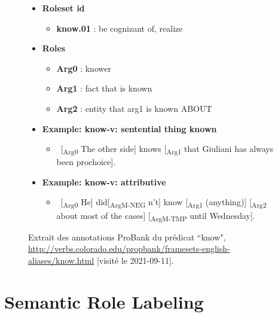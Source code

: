 \documentclass{KBook}
\begin{document}
\begin{figure}[ht]
	\centering
\begin{tcolorbox}[colback=white, colframe=blue, boxrule=1pt, text width=.85\textwidth]
	\footnotesize
	\begin{itemize}
		\item \textbf{Roleset id}
		\begin{itemize}\scriptsize
			\item \textbf{know.01} : be cognizant of, realize
		\end{itemize}
		\item \textbf{Roles}
		\begin{itemize}\scriptsize
			\item \textbf{Arg0} : knower
			\item \textbf{Arg1} : fact that is known
			\item \textbf{Arg2} : entity that arg1 is known ABOUT
		\end{itemize}
		
		\item \textbf{Example: know-v: sentential thing known}
		\begin{itemize}\scriptsize
			\item \ [\textsubscript{\color{red}Arg0} The other side] knows [\textsubscript{\color{red}Arg1} that Giuliani has always been prochoice].
		\end{itemize}
		
		\item \textbf{Example: know-v: attributive}
		\begin{itemize}\scriptsize
			\item \ [\textsubscript{\color{red}Arg0} He] did[\textsubscript{\color{red}ArgM-NEG} n't] know [\textsubscript{\color{red}Arg1} (anything)] [\textsubscript{\color{red}Arg2} about most of the cases] [\textsubscript{\color{red}ArgM-TMP} until Wednesday].
		\end{itemize}
	\end{itemize}\vspace*{-1cm}
\end{tcolorbox}
	\caption[Extrait des annotations ProBank d'un prédicat.]{Extrait des annotations ProBank du prédicat ``know", \url{http://verbs.colorado.edu/propbank/framesets-english-aliases/know.html} [visité le 2021-09-11].}
	\label{fig:propbank-predicat}
\end{figure}

\section{Semantic Role Labeling}
\end{document}
